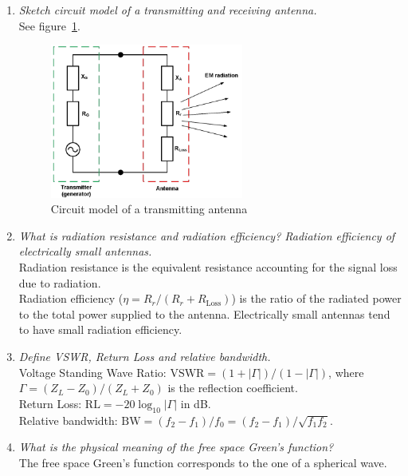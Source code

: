 \documentclass[11pt,a4paper]{article}
\begin{document}
\begin{enumerate}
    \item \emph{Sketch circuit model of a transmitting and receiving antenna.}\\
    See figure~\ref{fig:circuit-model-transmitting}.
    \begin{figure}[!ht]
        \centering
        \includegraphics[width=0.6\textwidth]{src/circuit-model-transmitting.png}
        \caption{\label{fig:circuit-model-transmitting}Circuit model of a transmitting antenna}
    \end{figure}

    \item \emph{What is radiation resistance and radiation efficiency? Radiation efficiency of electrically small antennas.}\\
    Radiation resistance is the equivalent resistance accounting for the signal loss due to radiation.\\
    Radiation efficiency ($\eta = R_r/(R_r+R_{\mathrm{Loss}})$) is the ratio of the radiated power to the total power supplied to the antenna. Electrically small antennas tend to have small radiation efficiency.

    \item \emph{Define VSWR, Return Loss and relative bandwidth.}\\
    Voltage Standing Wave Ratio: $\mathrm{VSWR} = (1+|\Gamma|)/(1-|\Gamma|)$, where $\Gamma = (Z_L-Z_0)/(Z_L + Z_0)$ is the reflection coefficient.\\
    Return Loss: $\mathrm{RL} = -20\log_{10}|\Gamma|$ in dB.\\
    Relative bandwidth: $\mathrm{BW} = (f_2-f_1)/f_0 = (f_2-f_1)/\sqrt{f_1f_2}$.

    \item \emph{What is the physical meaning of the free space Green's function?}\\
    The free space Green's function corresponds to the one of a spherical wave.


\end{enumerate}
\end{document}
